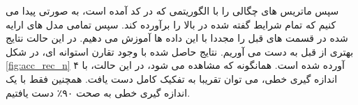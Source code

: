 سپس ماتریس های چگالی را با الگوریتمی که در کد آمده است،‌ به صورتی پیدا می کنیم که تمام شرایط گفته شده در بالا را برآورده کند. سپس تمامی مدل های ارایه شده در قسمت های قبل را مجددا با این داده ها آموزش می دهیم. در این حالت نتایج بهتری از قبل به دست می آوریم. نتایج حاصل شده با وجود تقارن استوانه ای، در شکل
\ref{fig:acc_rec_n}
آورده شده است. همانگونه که مشاهده می شود، در این حالت، با ۴
اندازه گیری خطی، می توان تقریبا به تفکیک کامل دست یافت. همچنین فقط با یک اندازه گیری خطی به صحت
۹۰٪
دست یافتیم.
